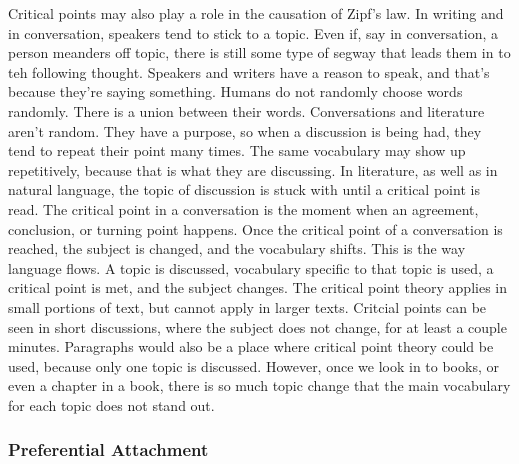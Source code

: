 \documentclass[a4paper,10pt]{article}
\begin{document}
Critical points may also play a role in the causation of Zipf's law. In writing and in conversation, speakers tend to stick to a topic. Even if, say in conversation, a person meanders off topic, there is still some type of segway that leads them in to teh following thought. Speakers and writers have a reason to speak, and that's because they're saying something. Humans do not randomly choose words randomly. There is a union between their words. Conversations and literature aren't random. They have a purpose, so when a discussion is being had, they tend to repeat their point many times. The same vocabulary may show up repetitively, because that is what they are discussing. In literature, as well as in natural language, the topic of discussion is stuck with until a critical point is read. The critical point in a conversation is the moment when an agreement, conclusion, or turning point happens. Once the critical point of a conversation is reached, the subject is changed, and the vocabulary shifts. This is the way language flows. A topic is discussed, vocabulary specific to that topic is used, a critical point is met, and the subject changes. The critical point theory applies in small portions of text, but cannot apply in larger texts. Critcial points can be seen in short discussions, where the subject does not change, for at least a couple minutes. Paragraphs would also be a place where critical point theory could be used, because only one topic is discussed. However, once we look in to books, or even a chapter in a book, there is so much topic change that the main vocabulary for each topic does not stand out. 

\subsubsection{Preferential Attachment}
\end{document}
